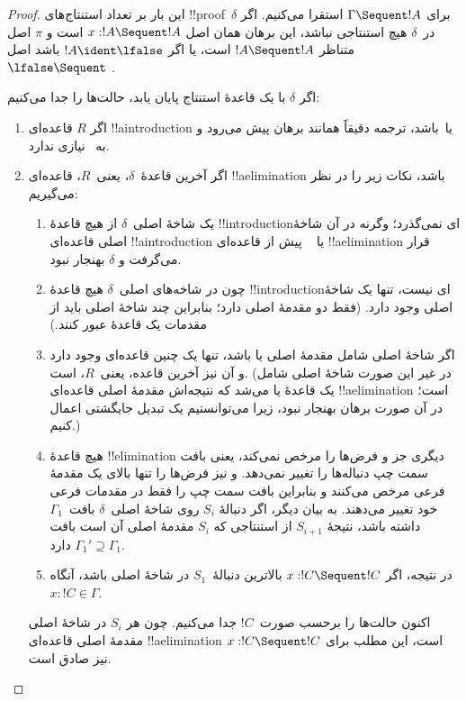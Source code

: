 \documentclass[../../../include/open-logic-section]{subfiles}
\begin{document}
\begin{proof}
این بار بر تعداد استنتاج‌های !!{proof}~$\delta$ برای
$\Gamma \Sequent !A$ استقرا می‌کنیم. اگر در~$\delta$ هیچ استنتاجی
نباشد، این برهان همان اصل $x:!A \Sequent !A$ است و $\pi$ اصل متناظر
$!A \Sequent !A$ است، یا اگر $!A \ident \lfalse$ باشد اصل
$\lfalse \Sequent \ $.

اگر $\delta$ با یک قاعدهٔ استنتاج پایان یابد، حالت‌ها را جدا می‌کنیم:
\begin{enumerate}
  \item اگر $R$ قاعده‌ای !!a{introduction} یا~\FalseInt باشد، ترجمه
  دقیقاً همانند برهان  پیش می‌رود و به
  ~\Cut نیازی ندارد.

  \item اگر آخرین قاعدهٔ~$\delta$، یعنی~$R$، قاعده‌ای
  !!a{elimination} باشد، نکات زیر را در نظر می‌گیریم:
  \begin{enumerate}
    \item یک شاخهٔ اصلی~$\delta$ از هیچ قاعدهٔ !!{introduction}‌ای
    نمی‌گذرد؛ وگرنه در آن شاخهٔ اصلی قاعده‌ای !!a{introduction} یا
    ~\FalseInt{} پیش از قاعده‌ای !!a{elimination} قرار می‌گرفت و
    $\delta$ بهنجار نبود.
    \item چون در شاخه‌های اصلی~$\delta$ هیچ قاعدهٔ
    !!{introduction}‌ای نیست، تنها یک شاخهٔ اصلی وجود دارد. (فقط
    \Intro{\land} دو مقدمهٔ اصلی دارد؛ بنابراین چند شاخهٔ اصلی باید
    از مقدمات یک قاعدهٔ \Intro{\land} عبور کنند.)
    \item اگر شاخهٔ اصلی شامل مقدمهٔ اصلی \Elim{\lor} یا
    \Elim{\lexists} باشد، تنها یک چنین قاعده‌ای وجود دارد و آن نیز
    آخرین قاعده، یعنی~$R$، است. (در غیر این صورت شاخهٔ اصلی شامل یک
    قاعدهٔ \Elim{\lor} یا \Elim{\lexists} می‌شد که نتیجه‌اش مقدمهٔ
    اصلی قاعده‌ای !!a{elimination} است؛ در آن صورت برهان بهنجار نبود،
    زیرا می‌توانستیم یک تبدیل جایگشتی اعمال کنیم.)
    \item هیچ قاعدهٔ !!{elimination} دیگری جز \Elim{\lor} و
    \Elim{\lexists} فرض‌ها را مرخص نمی‌کند، یعنی بافت سمت چپ دنباله‌ها
    را تغییر نمی‌دهد. \Elim{\lor} و \Elim{\lexists} نیز فرض‌ها را
    تنها بالای یک مقدمهٔ فرعی مرخص می‌کنند و بنابراین بافت سمت چپ را
    فقط در مقدمات فرعی خود تغییر می‌دهند. به بیان دیگر، اگر دنبالهٔ
    $S_i$ روی شاخهٔ اصلی~$\delta$ بافت~$\Gamma_1$ داشته باشد، نتیجهٔ
    $S_{i+1}$ از استنتاجی که $S_i$ مقدمهٔ اصلی آن است بافت
    $\Gamma_1' \supseteq \Gamma_1$ دارد.
    \item در نتیجه، اگر $x: !C \Sequent !C$ بالاترین دنبالهٔ~$S_1$
    در شاخهٔ اصلی باشد، آنگاه $x:!C \in \Gamma$.
  \end{enumerate}
  اکنون حالت‌ها را برحسب صورت~$!C$ جدا می‌کنیم. چون هر $S_i$ در
  شاخهٔ اصلی مقدمهٔ اصلی قاعده‌ای !!a{elimination} است، این مطلب برای
  $x:!C \Sequent !C$ نیز صادق است.


\end{enumerate}
\end{proof}
\end{document}
